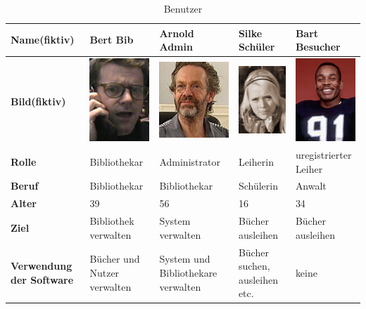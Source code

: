\documentclass[fontsize=12pt,paper=a4,twoside]{scrartcl}
\begin{document}
\begin{table}[htbp]
\caption{Benutzer}
\label{benutzer}
\begin{tabular}{|p{}||p{}|p{}|p{}|p{}|}
\hline 
\textbf{Name(fiktiv)} & Bert Bib & Arnold Admin & Silke Schüler & Bart Besucher\\ \hline
\textbf{Bild(fiktiv)} & \includegraphics[scale=1]{bib.jpg} & \includegraphics[scale=0.6]{admin.jpg} & \includegraphics[scale=0.45]{reg.jpg} & \includegraphics[scale=0.45]{unreg.jpg} \\ \hline
\textbf{Rolle} & Bibliothekar & Administrator & Leiherin & uregistrierter Leiher \\ \hline
\textbf{Beruf} & Bibliothekar & Bibliothekar & Schülerin & Anwalt\\ \hline
\textbf{Alter} & 39 & 56 & 16 & 34\\ \hline
\textbf{Ziel} & Bibliothek verwalten & System verwalten & Bücher ausleihen & Bücher ausleihen \\ \hline
\textbf{Verwendung der Software} & Bücher und Nutzer verwalten & System und Bibliothekare verwalten 
& Bücher suchen, ausleihen etc. & keine\\ \hline
\end{tabular}
\end{table}
\end{document}
